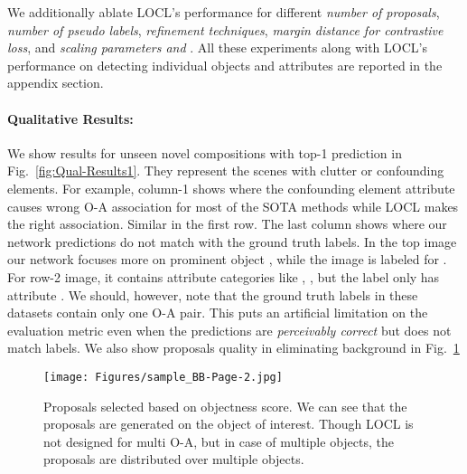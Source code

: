 \documentclass{bmvc2k}
\begin{document}
We additionally ablate LOCL's performance for different \textit{number of proposals}, \textit{number of pseudo labels}, \textit{refinement techniques}, \textit{margin distance for contrastive loss}, and \textit{scaling parameters  and }. All these experiments along with LOCL's performance on detecting individual objects and attributes are reported in the appendix section. 





\vspace{-0.3cm}
\paragraph{Qualitative Results:}
We show results for unseen novel compositions with top-1 prediction in Fig.~\ref{fig:Qual-Results1}. They represent the scenes with clutter or confounding elements.
For example, column-1 shows where the confounding element  attribute  causes wrong O-A association for most of the SOTA methods while LOCL makes the right association. Similar in the first row.
The last column shows where our network predictions do not match with the ground truth labels. 
In the top image our network focuses more on prominent object , while the image is labeled for .
For row-2 image, it contains attribute categories like , ,  but the label only has attribute . We should, however, note that the ground truth labels in these datasets contain only one O-A pair. 
This puts an artificial limitation on the evaluation metric even when the predictions are \textit{perceivably correct} but does not match labels.
We also show  proposals quality in eliminating background in Fig.~\ref{fig:samplebb2}

\vspace{-0.2cm}
\begin{figure}[t]
\begin{center}
\texttt{[image: Figures/sample\_BB-Page-2.jpg]}
\end{center}
  \vspace{-0.25in}
   \caption{Proposals selected based on objectness score. We can see that the proposals are generated on the object of interest. Though LOCL is not designed for multi O-A, but in case of multiple objects, the proposals are distributed over multiple objects.}
   \vspace{-0.25cm}
\label{fig:samplebb2}
\end{figure}
\end{document}
